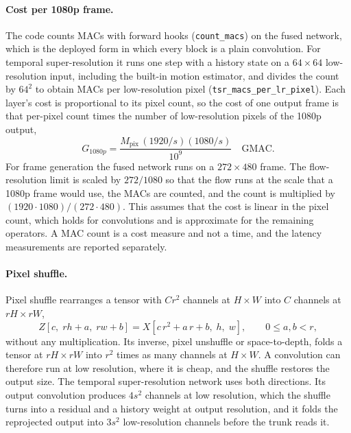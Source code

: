 \paragraph{Cost per 1080p frame.} The code counts MACs with forward hooks (\texttt{count\_macs}) on the fused network, which is the deployed form in which every block is a plain convolution. For temporal super-resolution it runs one step with a history state on a $64\times64$ low-resolution input, including the built-in motion estimator, and divides the count by $64^2$ to obtain MACs per low-resolution pixel (\texttt{tsr\_macs\_per\_lr\_pixel}). Each layer's cost is proportional to its pixel count, so the cost of one output frame is that per-pixel count times the number of low-resolution pixels of the 1080p output,
\begin{equation}
G_{1080p}=\frac{M_{\text{pix}}\,(1920/s)(1080/s)}{10^{9}}\quad\text{GMAC}.\label{eq:bg-gmac}
\end{equation}
For frame generation the fused network runs on a $272\times480$ frame. The flow-resolution limit is scaled by $272/1080$ so that the flow runs at the scale that a 1080p frame would use, the MACs are counted, and the count is multiplied by $(1920\cdot1080)/(272\cdot480)$. This assumes that the cost is linear in the pixel count, which holds for convolutions and is approximate for the remaining operators. A MAC count is a cost measure and not a time, and the latency measurements are reported separately.

\paragraph{Pixel shuffle.} Pixel shuffle \cite{shi2016espcn} rearranges a tensor with $C r^2$ channels at $H\times W$ into $C$ channels at $rH\times rW$,
\begin{equation}
Z[c,\;rh+a,\;rw+b]=X[c\,r^2+a\,r+b,\;h,\;w],\qquad 0\le a,b<r,\label{eq:bg-shuffle}
\end{equation}
without any multiplication. Its inverse, pixel unshuffle or space-to-depth, folds a tensor at $rH\times rW$ into $r^2$ times as many channels at $H\times W$. A convolution can therefore run at low resolution, where it is cheap, and the shuffle restores the output size. The temporal super-resolution network uses both directions. Its output convolution produces $4s^2$ channels at low resolution, which the shuffle turns into a residual and a history weight at output resolution, and it folds the reprojected output into $3s^2$ low-resolution channels before the trunk reads it.

